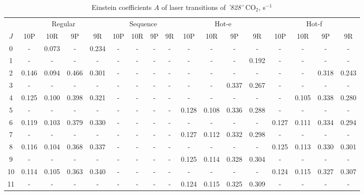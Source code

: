 \documentclass{report}
\begin{document}
\begin{appendices}
\begin{sidewaystable}
\centering
\caption{Einstein coefficients $A$ of laser transitions of \textit{'828'} {CO$_2$}, s$^{-1}$}
\label{table:A828}
\scriptsize
\begin{tabular}{|c|cccc|cccc|cccc|cccc|}
\hline
& \multicolumn{4}{c|}{Regular}& \multicolumn{4}{c|}{Sequence}& \multicolumn{4}{c|}{Hot-e}& \multicolumn{4}{c|}{Hot-f}\\
$J$ & 10P & 10R & 9P & 9R & 10P & 10R & 9P & 9R & 10P & 10R & 9P & 9R & 10P & 10R & 9P & 9R\\ 
\hline
0  &   -   & 0.073 &   -   & 0.234 &   -   &   -   &   -   &   -   &   -   &   -   &   -   &   -   &   -   &   -   &   -   &   -  \\
1  &   -   &   -   &   -   &   -   &   -   &   -   &   -   &   -   &   -   &   -   &   -   & 0.192 &   -   &   -   &   -   &   -  \\
2  & 0.146 & 0.094 & 0.466 & 0.301 &   -   &   -   &   -   &   -   &   -   &   -   &   -   &   -   &   -   &   -   & 0.318 & 0.243\\
3  &   -   &   -   &   -   &   -   &   -   &   -   &   -   &   -   &   -   &   -   & 0.337 & 0.267 &   -   &   -   &   -   &   -  \\
4  & 0.125 & 0.100 & 0.398 & 0.321 &   -   &   -   &   -   &   -   &   -   &   -   &   -   &   -   &   -   & 0.105 & 0.338 & 0.280\\
5  &   -   &   -   &   -   &   -   &   -   &   -   &   -   &   -   & 0.128 & 0.108 & 0.336 & 0.288 &   -   &   -   &   -   &   -  \\
6  & 0.119 & 0.103 & 0.379 & 0.330 &   -   &   -   &   -   &   -   &   -   &   -   &   -   &   -   & 0.127 & 0.111 & 0.334 & 0.294\\
7  &   -   &   -   &   -   &   -   &   -   &   -   &   -   &   -   & 0.127 & 0.112 & 0.332 & 0.298 &   -   &   -   &   -   &   -  \\
8  & 0.116 & 0.104 & 0.368 & 0.337 &   -   &   -   &   -   &   -   &   -   &   -   &   -   &   -   & 0.125 & 0.113 & 0.330 & 0.301\\
9  &   -   &   -   &   -   &   -   &   -   &   -   &   -   &   -   & 0.125 & 0.114 & 0.328 & 0.304 &   -   &   -   &   -   &   -  \\
10 & 0.114 & 0.105 & 0.363 & 0.340 &   -   &   -   &   -   &   -   &   -   &   -   &   -   &   -   & 0.124 & 0.115 & 0.327 & 0.307\\
11 &   -   &   -   &   -   &   -   &   -   &   -   &   -   &   -   & 0.124 & 0.115 & 0.325 & 0.309 &   -   &   -   &   -   &   -  \\

\end{tabular}
\end{sidewaystable}
\end{appendices}
\end{document}
